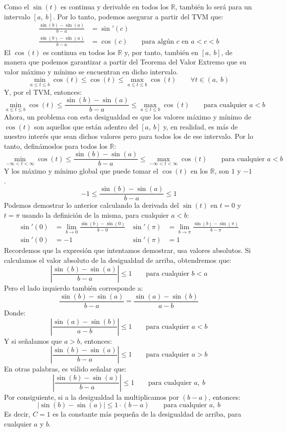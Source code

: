 \documentclass[12pt]{article}
\begin{document}
Como el $\sin(t)$ es continua y derivable en todos los $\mathbb{R}$, también lo será para un intervalo $[a, \ b]$. Por lo tanto, podemos asegurar a partir del TVM que:
\begin{align*}
  \frac{\sin(b) - \sin(a)}{b - a} &= \sin'(c) \\
  \frac{\sin(b) - \sin(a)}{b - a} &= \cos(c) \qquad \text{para algún } c \text{ en } a < c < b
\end{align*}
El $\cos(t)$ es continua en todos los $\mathbb{R}$ y, por tanto, también en $[a, \ b]$, de manera que podemos garantizar a partir del Teorema del Valor Extremo que su valor máximo y mínimo se encuentran en dicho intervalo.
\[
  \min_{a \leq t \leq b} \cos(t) \leq
  \cos(t) \leq
  \max_{a \leq t \leq b} \cos(t) \qquad
  \forall t \in (a, \ b)
\]
Y, por el TVM, entonces:
\[
  \min_{a \leq t \leq b} \cos(t) \leq
  \frac{\sin(b) - \sin(a)}{b - a} \leq
  \max_{a \leq t \leq b} \cos(t) \qquad
  \text{para cualquier } a < b
\]
Ahora, un problema con esta desigualdad es que los valores máximo y mínimo de $\cos(t)$ son aquellos que están adentro del $[a, \ b]$ y, en realidad, es más de nuestro interés que sean dichos valores pero para todos los de ese intervalo. Por lo tanto, definámoslos para todos los $\mathbb{R}$:
\[
  \min_{-\infty < t < \infty} \cos(t) \leq
  \frac{\sin(b) - \sin(a)}{b - a} \leq
  \max_{-\infty < t < \infty} \cos(t) \qquad
  \text{para cualquier } a < b
\]
Y los máximo y mínimo global que puede tomar el $\cos(t)$ en los $\mathbb{R}$, son $1$ y $-1$.
\[
  -1 \leq \frac{\sin(b) - \sin(a)}{b - a} \leq 1
\]
Podemos demostrar lo anterior calculando la derivada del $\sin(t)$ en $t = 0$ y $t = \pi$ usando la definición de la misma, para cualquier $a < b$:
\begin{align*}
  \sin'(0) &= \lim_{b \to 0} \frac{\sin(b) - \sin(0)}{b - 0} &
  \sin'(\pi) &= \lim_{b \to \pi} \frac{\sin(b) - \sin(\pi)}{b - \pi} \\
  \sin'(0) &= -1 &
  \sin'(\pi) &= 1
\end{align*}
Recordemos que la expresión que intentamos demostrar, usa valores absolutos. Si calculamos el valor absoluto de la desigualdad de arriba, obtendremos que:
\[
  \left\lvert \frac{\sin(b) - \sin(a)}{b - a} \right\rvert \leq 1 \qquad \text{para cualquier } b < a
\]
Pero el lado izquierdo también corresponde a:
\[
  \frac{\sin(b) - \sin(a)}{b - a} = \frac{\sin(a) - \sin(b)}{a - b}
\]
Donde:
\[
  \left\lvert \frac{\sin(a) - \sin(b)}{a - b} \right\rvert \leq 1 \qquad \text{para cualquier } a < b
\]
Y si señalamos que $a > b$, entonces:
\[
  \left\lvert \frac{\sin(b) - \sin(a)}{b - a} \right\rvert \leq 1 \qquad \text{para cualquier } a > b
\]
En otras palabras, es válido señalar que:
\[
  \left\lvert \frac{\sin(b) - \sin(a)}{b - a} \right\rvert \leq 1 \qquad \text{para cualquier } a, \ b
\]
Por consiguiente, si a la desigualdad la multiplicamos por $(b - a)$, entonces:
\[
  \left\lvert \sin(b) - \sin(a) \right\rvert \leq 1 \cdot (b - a) \qquad \text{para cualquier } a, \ b
\]
Es decir, $C = 1$ es la constante más pequeña de la desigualdad de arriba, para cualquier $a$ y $b$.
\end{document}
